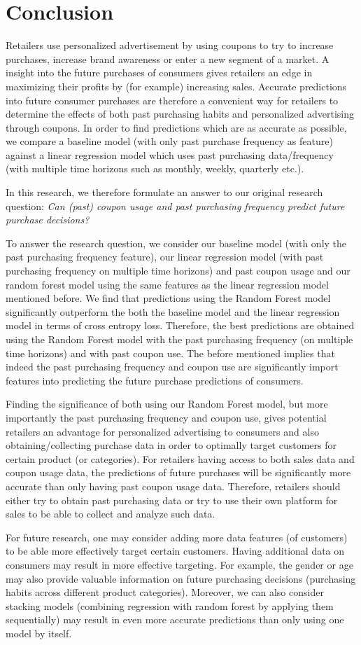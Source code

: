 \section{Conclusion}
Retailers use personalized advertisement by using coupons to try to increase
purchases, increase brand awareness or enter a new segment of a market. A
insight into the future purchases of consumers gives retailers an edge in
maximizing their profits by (for example) increasing sales. Accurate predictions
into future consumer purchases are therefore a convenient way for retailers to
determine the effects of both past purchasing habits and personalized
advertising through coupons. In order to find predictions which are as accurate
as possible, we compare a baseline model (with only past purchase frequency as
feature) against a linear regression model which uses past purchasing
data/frequency (with multiple time horizons such as monthly, weekly, quarterly
etc.).

In this research, we therefore formulate an answer to our original research
question: \textit{Can (past) coupon usage and past purchasing frequency predict
future purchase decisions?}

To answer the research question, we consider our baseline model (with only the
past purchasing frequency feature), our linear regression model (with past
purchasing frequency on multiple time horizons) and past coupon usage and our
random forest model using the same features as the linear regression model
mentioned before. We find that predictions using the Random Forest model
significantly outperform the both the baseline model and the linear regression
model in terms of cross entropy loss. Therefore, the best predictions are
obtained using the Random Forest model with the past purchasing frequency (on
multiple time horizons) and with past coupon use. The before mentioned implies
that indeed the past purchasing frequency and coupon use are significantly
import features into predicting the future purchase predictions of consumers.

Finding the significance of both using our Random Forest model, but more
importantly the past purchasing frequency and coupon use, gives potential
retailers an advantage for personalized advertising to consumers and also
obtaining/collecting purchase data in order to optimally target customers for
certain product (or categories). For retailers having access to both sales data
and coupon usage data, the predictions of future purchases will be significantly
more accurate than only having past coupon usage data. Therefore, retailers
should either try to obtain past purchasing data or try to use their own platform for sales
to be able to collect and analyze such data.

For future research, one may consider adding more data features (of customers)
to be able more effectively target certain customers. Having additional data on
consumers may result in more effective targeting. For example, the gender or age
may also provide valuable information on future purchasing decisions (purchasing
habits across different product categories). Moreover,
we can also consider stacking models (combining regression with random forest by
applying them sequentially) may result in even more accurate predictions than
only using one model by itself.
